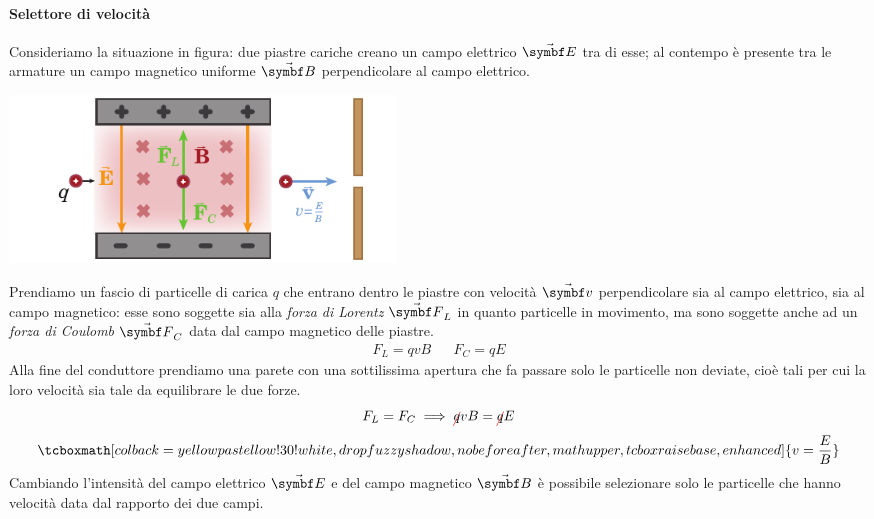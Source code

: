 \paragraph{Selettore di velocità}
Consideriamo la situazione in figura: due piastre cariche creano un campo elettrico $\vba{E}$ tra di esse; al contempo è presente tra le armature un campo magnetico uniforme $\vba{B}$ perpendicolare al campo elettrico.
\begin{center}
	\includegraphics[width=0.45\textwidth]{images/chp7/chp7selettore.pdf}
\end{center}
Prendiamo un fascio di particelle di carica $q$ che entrano dentro le piastre con velocità $\vba{v}$ perpendicolare sia al campo elettrico, sia al campo magnetico: esse sono soggette sia alla \textit{forza di Lorentz} $\vba{F}_L$ in quanto particelle in movimento, ma sono soggette anche ad un \textit{forza di Coulomb} $\vba{F}_C$ data dal campo magnetico delle piastre.
\begin{align*}
	F_L=qvB&&F_C=qE
\end{align*}
Alla fine del conduttore prendiamo una parete con una sottilissima apertura che fa passare solo le particelle non deviate, cioè tali per cui la loro velocità sia tale da equilibrare le due forze.
\begin{equation*}
	F_L=F_C\implies \Ccancel[red]{q}vB=\Ccancel[red]{q}E
\end{equation*}
\begin{equation}
	\tcboxmath[colback=yellowpastellow!30!white,drop fuzzy shadow, nobeforeafter, math upper, tcbox raise base, enhanced]{v=\frac{E}{B}}
\end{equation}
Cambiando l'intensità del campo elettrico $\vba{E}$ e del campo magnetico $\vba{B}$ è possibile selezionare solo le particelle che hanno velocità data dal rapporto dei due campi.
